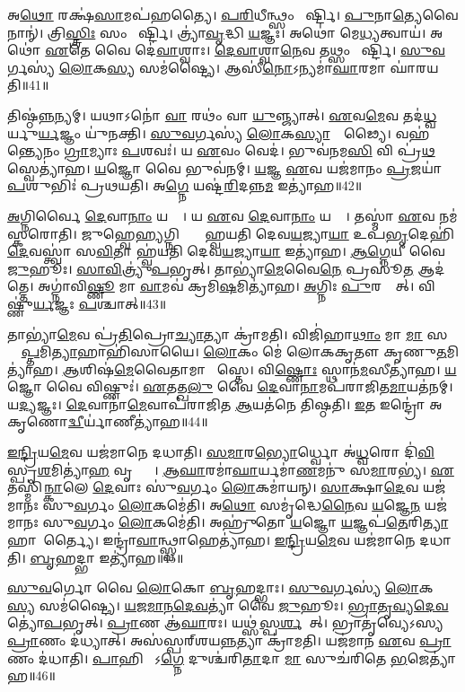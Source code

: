 𑌅\ul{𑌥𑍋} 𑌰𑌕𑍍𑌷॑\ul{𑌸𑌾}𑌮𑌪॑𑌹𑌤𑍍𑌯𑍈।
\ul{𑌪}\ul{𑌰𑌿}𑌧𑍀𑌨𑍍𑌥𑍍𑌸𑌂 𑌮𑌾᳚𑌰𑍍𑌷𑍍𑌟𑌿।
\ul{𑌪𑍁}𑌨𑌾\ul{𑌤𑍍𑌯𑍇}𑌵𑍈𑌨𑌾𑌨𑍍॑।
𑌤𑍍𑌰𑌿\ul{𑌸𑍍𑌤𑍍𑌰𑌿𑌃} 𑌸𑌂 𑌮𑌾᳚𑌰𑍍𑌷𑍍𑌟𑌿।
𑌤𑍍𑌰𑍍𑌯𑌾॑\ul{𑌵𑍃}𑌦𑍍𑌧𑌿 \ul{𑌯}𑌜𑍍𑌞𑌃।
𑌅𑌥𑍋॑ 𑌮𑍇\ul{𑌧𑍍𑌯}𑌤𑍍𑌵𑌾𑌯॑।
𑌅𑌥𑍋॑ \ul{𑌏}𑌤𑍇 𑌵𑍈 𑌦𑍇॑\ul{𑌵𑌾}𑌶𑍍𑌵𑌾𑌃।
\ul{𑌦𑍇}\ul{𑌵𑌾}𑌶𑍍𑌵𑌾\ul{𑌨𑍇}𑌵 𑌤𑌥𑍍𑌸𑌂 𑌮𑌾᳚𑌰𑍍𑌷𑍍𑌟𑌿।
\ul{𑌸𑍁}\ul{𑌵}𑌰𑍍𑌗𑌸𑍍𑌯॑ \ul{𑌲𑍋}𑌕\ul{𑌸𑍍𑌯} 𑌸𑌮॑𑌷𑍍𑌟𑍍𑌯𑍈।
𑌆𑌸𑍀॑\ul{𑌨𑍋}\-𑌽𑌨𑍍𑌯𑌮𑌾॑\ul{𑌘𑌾}𑌰𑌮𑌾 𑌘𑌾॑𑌰𑌯𑌤𑌿॥41॥

𑌤𑌿𑌷𑍍𑌠॑\ul{𑌨𑍍𑌨}𑌨𑍍𑌯𑌮𑍍।
𑌯𑌥𑌾𑌽𑌨𑍋॑ \ul{𑌵𑌾} 𑌰𑌥𑌂॑ 𑌵𑌾 \ul{𑌯𑍁}𑌞𑍍𑌜𑍍𑌯𑌾𑌤𑍍।
\ul{𑌏}𑌵\ul{𑌮𑍇}𑌵 𑌤𑌦॑\ul{𑌧𑍍𑌵}𑌰𑍍𑌯𑍁\ul{𑌰𑍍𑌯}𑌜𑍍𑌞𑌂 𑌯𑍁॑𑌨𑌕𑍍𑌤𑌿।
\ul{𑌸𑍁}\ul{𑌵}𑌰𑍍𑌗𑌸𑍍𑌯॑ \ul{𑌲𑍋}𑌕\ul{𑌸𑍍𑌯𑌾}𑌭𑍍𑌯𑍂᳚𑌢𑍍𑌯𑍈।
𑌵𑌹॑𑌨𑍍𑌤𑍍𑌯𑍇𑌨𑌂 \ul{𑌗𑍍𑌰𑌾}𑌮𑍍𑌯𑌾𑌃 \ul{𑌪}𑌶𑌵𑌃॑।
𑌯 \ul{𑌏}𑌵𑌂 𑌵𑍇𑌦॑।
𑌭𑍁𑌵॑𑌨𑌮\ul{𑌸𑌿} 𑌵𑌿 𑌪𑍍𑌰॑\ul{𑌥}𑌸𑍍𑌵𑍇𑌤𑍍𑌯𑌾॑𑌹।
\ul{𑌯}𑌜𑍍𑌞𑍋 𑌵𑍈 𑌭𑍁𑌵॑𑌨𑌮𑍍।
\ul{𑌯}𑌜𑍍𑌞 \ul{𑌏}𑌵 𑌯𑌜॑𑌮𑌾𑌨𑌂 \ul{𑌪𑍍𑌰}𑌜𑌯𑌾॑ \ul{𑌪}𑌶𑍁𑌭𑌿𑌃॑ 𑌪𑍍𑌰𑌥𑌯𑌤𑌿।
𑌅\ul{𑌗𑍍𑌨𑍇} 𑌯𑌷𑍍𑌟॑\ul{𑌰𑌿}𑌦𑌨𑍍𑌨\ul{𑌮} 𑌇𑌤𑍍𑌯𑌾॑𑌹॥42॥

\ul{𑌅}𑌗𑍍𑌨𑌿𑌰𑍍𑌵𑍈 \ul{𑌦𑍇}𑌵𑌾\ul{𑌨𑌾𑌂} 𑌯𑌷𑍍𑌟𑌾᳚।
𑌯 \ul{𑌏}𑌵 \ul{𑌦𑍇}𑌵𑌾\ul{𑌨𑌾𑌂} 𑌯𑌷𑍍𑌟𑌾᳚।
𑌤𑌸𑍍𑌮𑌾॑ \ul{𑌏}𑌵 𑌨𑌮॑𑌸𑍍𑌕𑌰𑍋𑌤𑌿।
𑌜𑍁𑌹𑍍𑌵𑍇\ul{𑌹𑍍𑌯}𑌗𑍍𑌨𑌿𑌸𑍍𑌤𑍍𑌵𑌾᳚ 𑌹𑍍𑌵𑌯𑌤𑌿 𑌦𑍇𑌵\ul{𑌯}𑌜𑍍𑌯𑌾\ul{𑌯𑌾} 𑌉𑌪॑\ul{𑌭𑍃}𑌦𑍇𑌹𑌿॑ \ul{𑌦𑍇}𑌵𑌸𑍍𑌤𑍍𑌵𑌾॑ 𑌸\ul{𑌵𑌿}𑌤𑌾 𑌹𑍍𑌵॑𑌯𑌤𑌿 𑌦𑍇𑌵\ul{𑌯}𑌜𑍍𑌯𑌾\ul{𑌯𑌾} 𑌇𑌤𑍍𑌯𑌾॑𑌹।
\ul{𑌆}\ul{𑌗𑍍𑌨𑍇}𑌯𑍀 𑌵𑍈 \ul{𑌜𑍁}𑌹𑍂𑌃।
\ul{𑌸𑌾}\ul{𑌵𑌿}𑌤𑍍𑌰𑍍𑌯𑍁॑\ul{𑌪}𑌭𑍃𑌤𑍍।
𑌤𑌾𑌭𑍍𑌯𑌾॑\ul{𑌮𑍇}𑌵𑍈\ul{𑌨𑍇} 𑌪𑍍𑌰𑌸𑍂॑\ul{𑌤} 𑌆𑌦॑𑌤𑍍𑌤𑍇।
𑌅𑌗𑍍𑌨𑌾॑𑌵𑌿\ul{𑌷𑍍𑌣𑍂} 𑌮𑌾 \ul{𑌵𑌾}𑌮𑌵॑ 𑌕𑍍𑌰𑌮𑌿\ul{𑌷}𑌮𑌿𑌤𑍍𑌯𑌾॑𑌹।
\ul{𑌅}𑌗𑍍𑌨𑌿𑌃 \ul{𑌪𑍁}𑌰𑌸𑍍𑌤𑌾᳚𑌤𑍍।
𑌵𑌿𑌷𑍍𑌣𑍁॑\ul{𑌰𑍍𑌯}𑌜𑍍𑌞𑌃 \ul{𑌪}𑌶𑍍𑌚𑌾𑌤𑍍॥43॥

𑌤𑌾𑌭𑍍𑌯𑌾॑\ul{𑌮𑍇}𑌵 𑌪𑍍𑌰॑\ul{𑌤𑌿}𑌪𑍍𑌰𑍋\ul{𑌚𑍍𑌯𑌾}𑌤𑍍𑌯𑌾 𑌕𑍍𑌰𑌾॑𑌮𑌤𑌿।
𑌵𑌿𑌜𑌿॑𑌹𑌾\ul{𑌥𑌾𑌂} 𑌮𑌾 \ul{𑌮𑌾} 𑌸𑌨𑍍𑌤𑌾᳚\ul{𑌪𑍍𑌤}𑌮𑌿\ul{𑌤𑍍𑌯𑌾}𑌹𑌾𑌹𑌿॑𑌸𑌾𑌯𑍈।
\ul{𑌲𑍋}𑌕𑌂 𑌮𑍇॑ 𑌲𑍋𑌕𑌕𑍃𑌤𑍗 𑌕𑍃𑌣𑍁\ul{𑌤}𑌮𑌿𑌤𑍍𑌯𑌾॑𑌹।
\ul{𑌆}𑌶𑌿𑌷॑\ul{𑌮𑍇}𑌵𑍈𑌤𑌾𑌮𑌾 𑌶𑌾᳚𑌸𑍍𑌤𑍇।
𑌵𑌿\ul{𑌷𑍍𑌣𑍋𑌃} 𑌸𑍍𑌥𑌾𑌨॑\ul{𑌮}𑌸𑍀𑌤𑍍𑌯𑌾॑𑌹।
\ul{𑌯}𑌜𑍍𑌞𑍋 𑌵𑍈 𑌵𑌿𑌷𑍍𑌣𑍁𑌃॑।
\ul{𑌏}𑌤𑌤𑍍𑌖\ul{𑌲𑍁} 𑌵𑍈 \ul{𑌦𑍇}𑌵𑌾\ul{𑌨𑌾}𑌮𑌪॑𑌰𑌾𑌜𑌿𑌤\ul{𑌮𑌾}𑌯𑌤॑𑌨𑌮𑍍।
𑌯\ul{𑌦𑍍𑌯}𑌜𑍍𑌞𑌃।
\ul{𑌦𑍇}𑌵𑌾𑌨𑌾॑\ul{𑌮𑍇}𑌵𑌾𑌪॑𑌰𑌾𑌜𑌿𑌤 \ul{𑌆}𑌯𑌤॑𑌨𑍇 𑌤𑌿𑌷𑍍𑌠𑌤𑌿।
\ul{𑌇}𑌤 𑌇𑌨𑍍𑌦𑍍𑌰𑍋॑ 𑌅𑌕𑍃𑌣𑍋\ul{𑌦𑍍𑌵𑍀}𑌰𑍍𑌯𑌾॑𑌣𑍀𑌤𑍍𑌯𑌾॑𑌹॥44॥

\ul{𑌇}\ul{𑌨𑍍𑌦𑍍𑌰𑌿}𑌯\ul{𑌮𑍇}𑌵 𑌯𑌜॑𑌮𑌾𑌨𑍇 𑌦𑌧𑌾𑌤𑌿।
\ul{𑌸}\ul{𑌮𑌾}𑌰\ul{𑌭𑍍𑌯𑍋}𑌰𑍍𑌧𑍍𑌵𑍋 𑌅॑\ul{𑌧𑍍𑌵}𑌰𑍋 𑌦𑌿॑\ul{𑌵𑌿}𑌸𑍍𑌪𑍃\ul{𑌶}𑌮𑌿𑌤𑍍𑌯𑌾॑\ul{𑌹} 𑌵𑍃𑌦𑍍𑌧𑍍𑌯𑍈᳚।
\ul{𑌆}\ul{𑌘𑌾}𑌰𑌮𑌾॑\ul{𑌘𑌾}𑌰𑍍𑌯𑌮𑌾॑\ul{𑌣}𑌮𑌨𑍁॑ 𑌸\ul{𑌮𑌾}𑌰𑌭𑍍𑌯॑।
\ul{𑌏}𑌤𑌸𑍍𑌮𑌿॑\ul{𑌨𑍍𑌕𑌾}𑌲𑍇 \ul{𑌦𑍇}𑌵𑌾𑌃 𑌸𑍁॑\ul{𑌵}𑌰𑍍𑌗𑌂 \ul{𑌲𑍋}𑌕𑌮𑌾॑𑌯𑌨𑍍।
\ul{𑌸𑌾}𑌕𑍍𑌷𑌾\ul{𑌦𑍇}𑌵 𑌯𑌜॑𑌮𑌾𑌨𑌃 𑌸𑍁\ul{𑌵}𑌰𑍍𑌗𑌂 \ul{𑌲𑍋}𑌕𑌮𑍇॑𑌤𑌿।
𑌅\ul{𑌥𑍋} 𑌸𑌮𑍃॑𑌦𑍍𑌧𑍇\ul{𑌨𑍈}𑌵 \ul{𑌯}𑌜𑍍𑌞𑍇\ul{𑌨} 𑌯𑌜॑𑌮𑌾𑌨𑌃 𑌸𑍁\ul{𑌵}𑌰𑍍𑌗𑌂 \ul{𑌲𑍋}𑌕𑌮𑍇॑𑌤𑌿।
𑌅𑌹𑍍𑌰𑍁॑𑌤𑍋 \ul{𑌯}𑌜𑍍𑌞𑍋 \ul{𑌯}𑌜𑍍𑌞𑌪॑\ul{𑌤𑍇}𑌰𑌿\ul{𑌤𑍍𑌯𑌾}𑌹𑌾𑌨𑌾᳚𑌰𑍍𑌤𑍍𑌯𑍈।
𑌇𑌨𑍍𑌦𑍍𑌰𑌾॑\ul{𑌵𑌾}𑌨𑍍𑌥𑍍𑌸𑍍𑌵𑌾𑌹𑍇𑌤𑍍𑌯𑌾॑𑌹।
\ul{𑌇}\ul{𑌨𑍍𑌦𑍍𑌰𑌿}𑌯\ul{𑌮𑍇}𑌵 𑌯𑌜॑𑌮𑌾𑌨𑍇 𑌦𑌧𑌾𑌤𑌿।
\ul{𑌬𑍃}𑌹𑌦𑍍𑌭𑌾 𑌇𑌤𑍍𑌯𑌾॑𑌹॥45॥

\ul{𑌸𑍁}\ul{𑌵}𑌰𑍍𑌗𑍋 𑌵𑍈 \ul{𑌲𑍋}𑌕𑍋 \ul{𑌬𑍃}𑌹𑌦𑍍𑌭𑌾𑌃।
\ul{𑌸𑍁}\ul{𑌵}𑌰𑍍𑌗𑌸𑍍𑌯॑ \ul{𑌲𑍋}𑌕\ul{𑌸𑍍𑌯} 𑌸𑌮॑𑌷𑍍𑌟𑍍𑌯𑍈।
\ul{𑌯}\ul{𑌜}\ul{𑌮𑌾}\ul{𑌨}\ul{𑌦𑍇}\ul{𑌵}𑌤𑍍𑌯𑌾॑ 𑌵𑍈 \ul{𑌜𑍁}𑌹𑍂𑌃।
\ul{𑌭𑍍𑌰𑌾}\ul{𑌤𑍃}\ul{𑌵𑍍𑌯}\ul{𑌦𑍇}\ul{𑌵}𑌤𑍍𑌯𑍋॑\ul{𑌪}𑌭𑍃𑌤𑍍।
\ul{𑌪𑍍𑌰𑌾}𑌣 𑌆॑\ul{𑌘𑌾}𑌰𑌃।
𑌯𑌥𑍍𑌸॑\ul{𑌸𑍍𑌪}\ul{𑌰𑍍}𑌶𑌯𑍇᳚𑌤𑍍।
𑌭𑍍𑌰𑌾𑌤𑍃॑𑌵𑍍𑌯𑍇𑌽𑌸𑍍𑌯 \ul{𑌪𑍍𑌰𑌾}𑌣𑌂 𑌦॑𑌧𑍍𑌯𑌾𑌤𑍍।
𑌅𑌸॑𑌸𑍍𑌪𑌰𑍍‌\mbox{}𑌶𑌯\ul{𑌨𑍍𑌨}𑌤𑍍𑌯𑌾 𑌕𑍍𑌰𑌾॑𑌮𑌤𑌿।
𑌯𑌜॑𑌮𑌾𑌨 \ul{𑌏}𑌵 \ul{𑌪𑍍𑌰𑌾}𑌣𑌂 𑌦॑𑌧𑌾𑌤𑌿।
\ul{𑌪𑌾}𑌹𑌿 𑌮𑌾᳚\-𑌽\ul{𑌗𑍍𑌨𑍇} 𑌦𑍁𑌶𑍍𑌚॑𑌰𑌿\ul{𑌤𑌾}𑌦𑌾 \ul{𑌮𑌾} 𑌸𑍁𑌚॑𑌰𑌿𑌤𑍇 \ul{𑌭}𑌜𑍇𑌤𑍍𑌯𑌾॑𑌹॥46॥

